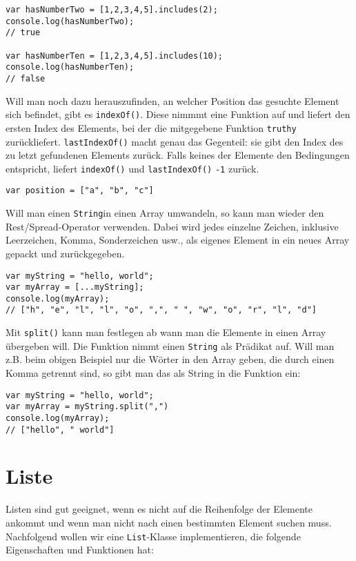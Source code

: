 \documentclass{book}
\begin{document}
\begin{lstlisting}[caption=Array Konstruktor]
var hasNumberTwo = [1,2,3,4,5].includes(2);
console.log(hasNumberTwo);
// true

var hasNumberTen = [1,2,3,4,5].includes(10);
console.log(hasNumberTen);
// false
\end{lstlisting}

Will man noch dazu herauszufinden, an welcher Position das gesuchte Element sich befindet, gibt es \lstinline|indexOf()|. Diese nimmmt eine Funktion auf und liefert den ersten Index des Elements, bei der die mitgegebene Funktion \lstinline|truthy| zurückliefert. \lstinline|lastIndexOf()| macht genau das Gegenteil: sie gibt den Index des zu letzt gefundenen Elements zurück. Falls keines der Elemente den Bedingungen entspricht, liefert \lstinline|indexOf()| und \lstinline|lastIndexOf()| \lstinline|-1| zurück.

\begin{lstlisting}[caption=Array Konstruktor]
var position = ["a", "b", "c"]
\end{lstlisting}

Will man einen \lstinline|String|in einen Array umwandeln, so kann man wieder den Rest/Spread-Operator verwenden. Dabei wird jedes einzelne Zeichen, inklusive Leerzeichen, Komma, Sonderzeichen usw., als eigenes Element in ein neues Array gepackt und zurückgegeben.

\begin{lstlisting}[caption=Array Konstruktor]
var myString = "hello, world";
var myArray = [...myString];
console.log(myArray);
// ["h", "e", "l", "l", "o", ",", " ", "w", "o", "r", "l", "d"]
\end{lstlisting}

Mit \lstinline|split()| kann man festlegen ab wann man die Elemente in einen Array übergeben will. Die Funktion nimmt einen \lstinline|String| als Prädikat auf. Will man z.B. beim obigen Beispiel nur die Wörter in den Array geben, die durch einen Komma getrennt sind, so gibt man das als String in die Funktion ein:
\begin{lstlisting}[caption=Array Konstruktor]
var myString = "hello, world";
var myArray = myString.split(",")
console.log(myArray);
// ["hello", " world"]
\end{lstlisting}

\section{Liste}
Listen sind gut geeignet, wenn es nicht auf die Reihenfolge der Elemente ankommt und wenn man nicht nach einen bestimmten Element suchen muss. Nachfolgend wollen wir eine \lstinline|List|-Klasse implementieren, die folgende Eigenschaften und Funktionen hat:
\end{document}

